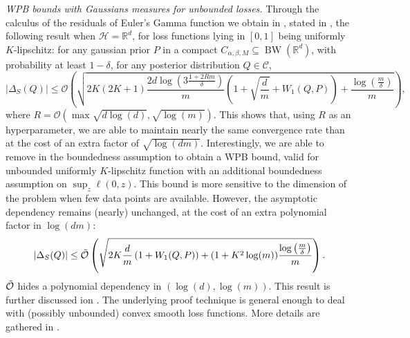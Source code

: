 \textit{WPB bounds with Gaussians measures for unbounded losses.} Through the calculus of the residuals of Euler's Gamma function we obtain in , stated in , the following result when $\mathcal{H}=\mathbb{R}^d$, for loss functions lying in $[0,1]$ being uniformly $K$-lipschitz: for any gaussian prior $P$ in a compact $C_{\alpha,\beta,M}\subseteq \operatorname{BW}(\mathbb{R}^d)$, with probability at least $1-\delta$, for any posterior distribution $Q\in \mathcal{C}$,
\[ |\Delta_S(Q)| \leq \mathcal{O}\left(\sqrt{2K(2K+1)\frac{2d\log\left(3\frac{1 +2Rm }{\delta}\right)}{m} \left(1+ \sqrt{\frac{d}{m}} + W_1(Q,P)  \right) +\frac{\log\left( \frac{m}{\delta} \right)}{m}} \right), \]
where $R= \mathcal{O}(\max \sqrt{d\log(d)},\sqrt{\log(m)})$.
This shows that, using $R$ as an hyperparameter, we are able to maintain nearly the same convergence rate than  at the cost of an extra factor of $\sqrt{\log(dm)}$.
Interestingly, we are able to remove in  the boundedness assumption to obtain a WPB bound, valid for unbounded uniformly $K$-lipschitz function  with an additional boundedness assumption on $\sup_{z} \ell(0,z)$. This bound is more sensitive to the dimension of the problem when few data points are available. However, the asymptotic dependency remains (nearly) unchanged, at the cost of an extra polynomial factor in $\log(dm)$:
\begin{align}
|\Delta_S(Q)|  \leq\Tilde{\mathcal{O}}\left( \sqrt{2K\frac{d}{m}\left(1 + W_1(Q,P)\right)+(1+K^2\log(m))\frac{\log\left( \frac{m}{\delta} \right)}{m}}   \right).
\end{align}
$\Tilde{\mathcal{O}}$ hides a polynomial dependency in $(\log(d),\log(m))$. This result is further discussed ion . The underlying proof technique is general enough to deal with (possibly unbounded) convex smooth loss functions. More details are gathered in .

